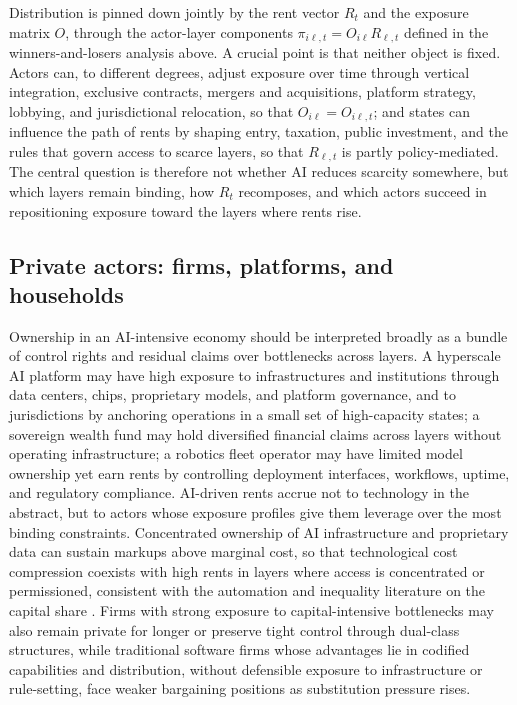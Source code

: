 \documentclass[11pt]{article}
\begin{document}
Distribution is pinned down jointly by the rent vector \(R_t\) and the exposure matrix \(O\), through the actor-layer components \(\pi_{i\ell,t}=O_{i\ell}R_{\ell,t}\) defined in the winners-and-losers analysis above. A crucial point is that neither object is fixed. Actors can, to different degrees, adjust exposure over time through vertical integration, exclusive contracts, mergers and acquisitions, platform strategy, lobbying, and jurisdictional relocation, so that \(O_{i\ell}=O_{i\ell,t}\); and states can influence the path of rents by shaping entry, taxation, public investment, and the rules that govern access to scarce layers, so that \(R_{\ell,t}\) is partly policy-mediated. The central question is therefore not whether AI reduces scarcity somewhere, but which layers remain binding, how \(R_t\) recomposes, and which actors succeed in repositioning exposure toward the layers where rents rise.

\subsection{\texorpdfstring{Private actors: firms, platforms, and households}{Private actors: firms, platforms, and households}}

Ownership in an AI-intensive economy should be interpreted broadly as a bundle of control rights and residual claims over bottlenecks across layers. A hyperscale AI platform may have high exposure to infrastructures and institutions through data centers, chips, proprietary models, and platform governance, and to jurisdictions by anchoring operations in a small set of high-capacity states; a sovereign wealth fund may hold diversified financial claims across layers without operating infrastructure; a robotics fleet operator may have limited model ownership yet earn rents by controlling deployment interfaces, workflows, uptime, and regulatory compliance. AI-driven rents accrue not to technology in the abstract, but to actors whose exposure profiles give them leverage over the most binding constraints. Concentrated ownership of AI infrastructure and proprietary data can sustain markups above marginal cost, so that technological cost compression coexists with high rents in layers where access is concentrated or permissioned, consistent with the automation and inequality literature on the capital share \citep{AcemogluRestrepo2018,AcemogluRestrepo2021}. Firms with strong exposure to capital-intensive bottlenecks may also remain private for longer or preserve tight control through dual-class structures, while traditional software firms whose advantages lie in codified capabilities and distribution, without defensible exposure to infrastructure or rule-setting, face weaker bargaining positions as substitution pressure rises.
\end{document}
